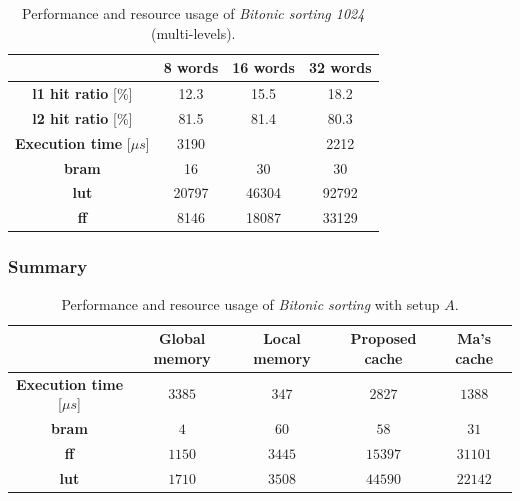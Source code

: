 \documentclass[11pt,a4paper,oneside]{memoir}
\begin{document}
\begin{table}[H]
	\begin{center}
		\begin{tabular}{cccc}
			\hline
			\rowcolor{gray!50}
			& \textbf{8 words} & \textbf{16 words} & \textbf{32 words} \\
			\hline
			\textbf{\ac{l1} hit ratio} [\%] & 12.3 & 15.5 & 18.2 \\
			\rowcolor{gray!25}
			\textbf{\ac{l2} hit ratio} [\%] & 81.5 & 81.4 & 80.3 \\
			\textbf{Execution time} [$\mu s$] & 3190 & & 2212 \\
			\rowcolor{gray!25}
			\textbf{\ac{bram}} & 16 & 30 & 30 \\
			\textbf{\acs{lut}} & 20797 & 46304 & 92792 \\
			\rowcolor{gray!25}
			\textbf{\acs{ff}} & 8146 & 18087 & 33129 \\
			\hline
		\end{tabular}
	\end{center}
	\caption{Performance and resource usage of \emph{Bitonic sorting 1024} (multi-levels).}
	\label{tab:bitonic_1024_l1_report}
\end{table}

\subsubsection{Summary}
\begin{table}[!htb]
	\begin{center}
		\begin{tabularx}{\textwidth}{CCCCC}
			\hline
			& \textbf{Global memory} & \textbf{Local memory} &
			\textbf{Proposed cache} & \textbf{Ma's cache} \\
			\hline
			\textbf{Execution time} [$\mu s$] & $3385$ & $347$ &
			$2827$ & $1388$ \\
			\textbf{\ac{bram}} & $4$ & $60$ & $58$ & $31$ \\
			\textbf{\acs{ff}} & $1150$ & $3445$ & $15397$ & $31101$ \\
			\textbf{\acs{lut}} & $1710$ & $3508$ & $44590$ & $22142$ \\
			\hline
		\end{tabularx}
	\end{center}
	\caption{Performance and resource usage of \emph{Bitonic sorting}
	with setup $A$.}
	\label{tab:bitonic_report_a}
\end{table}
\end{document}
